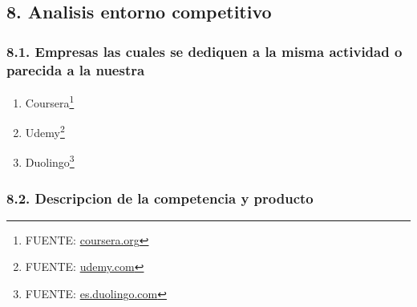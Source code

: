\documentclass[
]{article}
\begin{document}
\subsection{8. Analisis entorno
competitivo}\label{analisis-entorno-competitivo}

\subsubsection{8.1. Empresas las cuales se dediquen a la misma actividad
o parecida a la
nuestra}\label{empresas-las-cuales-se-dediquen-a-la-misma-actividad-o-parecida-a-la-nuestra}

\begin{enumerate}
\def\labelenumi{\alph{enumi}.}
\item
  Coursera\footnote{FUENTE:
    \href{https://www.coursera.org/}{coursera.org}}
\item
  Udemy\footnote{FUENTE: \href{https://www.udemy.com/}{udemy.com}}
\item
  Duolingo\footnote{FUENTE:
    \href{https://es.duolingo.com/}{es.duolingo.com}}
\end{enumerate}

\subsubsection{8.2. Descripcion de la competencia y
producto}\label{descripcion-de-la-competencia-y-producto}
\end{document}
